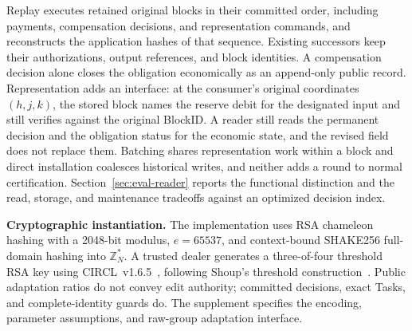 Replay executes retained original blocks in their committed order, including payments, compensation decisions, and representation commands, and reconstructs the application hashes of that sequence. Existing successors keep their authorizations, output references, and block identities. A compensation decision alone closes the obligation economically as an append-only public record. Representation adds an interface: at the consumer's original coordinates $(h,j,k)$, the stored block names the reserve debit for the designated input and still verifies against the original BlockID. A reader still reads the permanent decision and the obligation status for the economic state, and the revised field does not replace them. Batching shares representation work within a block and direct installation coalesces historical writes, and neither adds a round to normal certification. Section~\ref{sec:eval-reader} reports the functional distinction and the read, storage, and maintenance tradeoffs against an optimized decision index.

\noindent\textbf{Cryptographic instantiation.}
The implementation uses RSA chameleon hashing with a 2048-bit modulus,
$e=65537$, and context-bound SHAKE256 full-domain hashing into
$\mathbb Z_N^*$. A trusted dealer generates a three-of-four threshold RSA
key using CIRCL~v1.6.5~\cite{circl}, following Shoup's threshold
construction~\cite{shoup}. Public adaptation ratios do not convey edit
authority; committed decisions, exact Tasks, and complete-identity guards
do. The supplement specifies the encoding, parameter assumptions, and
raw-group adaptation interface.

